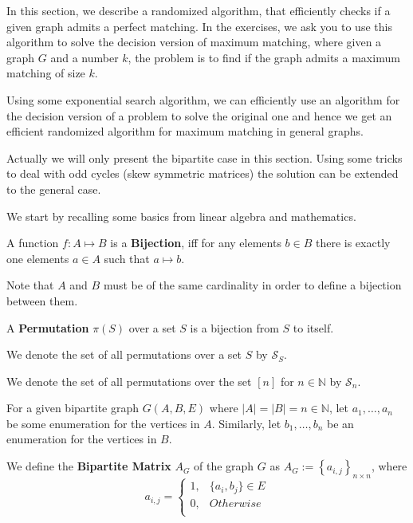 In this section, we describe a randomized algorithm, that efficiently checks if a given graph admits a perfect matching. In the exercises, we ask you to use this algorithm to solve the decision version of maximum matching, where given a graph $G$ and a number $k$, the problem is to find if the graph admits a maximum matching of size $k$. 

Using some exponential search algorithm, we can efficiently use an algorithm for the decision version of a problem to solve the original one and hence we get an efficient randomized algorithm for maximum matching in general graphs.

Actually we will only present the bipartite case in this section. Using some tricks to deal with odd cycles (skew symmetric matrices) the solution can be extended to the general case.

We start by recalling some basics from linear algebra and mathematics.
\begin{definition}
A function $f:A \mapsto B$ is a \textbf{Bijection}, iff for any elements $b \in B$ there is exactly one elements $a \in A$ such that $a \mapsto b$.
\end{definition}
Note that $A$ and $B$ must be of the same cardinality in order to define a bijection between them.

\begin{definition}
	A \textbf{Permutation} $\pi(S)$ over a set $S$ is a bijection from $S$ to itself.
\end{definition}
We denote the set of all permutations over a set $S$ by $\mathcal{S}_S$.

We denote the set of all permutations over the set $[n]$ for $n \in \mathbb{N}$ by $\mathcal{S}_n$.

\begin{definition}
	For a given bipartite graph $G(A, B, E)$ where $|A| = |B| = n \in \mathbb{N}$, let $a_1, \dots, a_n$ be some enumeration for the vertices in $A$. Similarly, let $b_1, \dots, b_n$ be an enumeration for the vertices in $B$.
	
	We define the \textbf{Bipartite Matrix} $A_G$ of the graph $G$ as $A_G := \left\{a_{i, j}\right\}_{n \times n}$, where 
	\begin{equation*}
		a_{i,j} =
		\begin{cases}
			1, & \{a_i, b_j\} \in E\\
			0, & Otherwise\\
		\end{cases}
	\end{equation*}
\end{definition}

